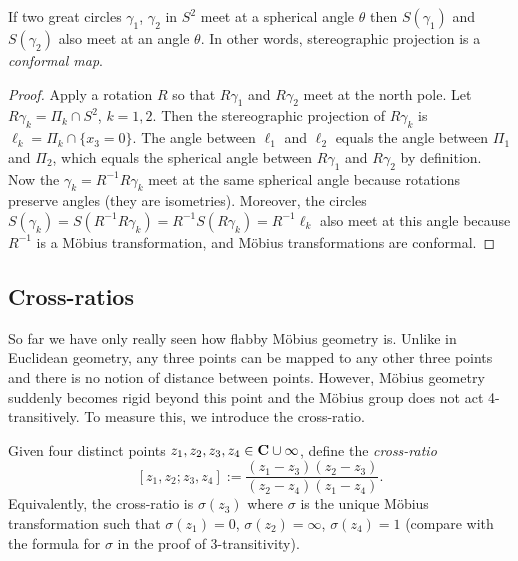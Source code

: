 \documentclass[12pt]{article}
\begin{document}
\begin{thm}
  If two great circles $\gamma_1$, $\gamma_2$ in $S^2$ meet at a spherical angle $\theta$ then $S(\gamma_1)$ and $S(\gamma_2)$ also meet at an angle $\theta$. In other words, stereographic projection is a {\em conformal map}.
\end{thm}
\begin{proof}
  Apply a rotation $R$ so that $R\gamma_1$ and $R\gamma_2$ meet at the north pole. Let $R\gamma_k=\Pi_k\cap S^2$, $k=1,2$. Then the stereographic projection of $R\gamma_k$ is $\ell_k=\Pi_k\cap\{x_3=0\}$. The angle between $\ell_1$ and $\ell_2$ equals the angle between $\Pi_1$ and $\Pi_2$, which equals the spherical angle between $R\gamma_1$ and $R\gamma_2$ by definition. Now the $\gamma_k=R^{-1}R\gamma_k$ meet at the same spherical angle because rotations preserve angles (they are isometries). Moreover, the circles $S(\gamma_k)=S(R^{-1}R\gamma_k)=R^{-1}S(R\gamma_k)=R^{-1}\ell_k$ also meet at this angle because $R^{-1}$ is a M\"obius transformation, and M\"obius transformations are conformal.
\end{proof}

\subsection{Cross-ratios}

So far we have only really seen how flabby M\"obius geometry is. Unlike in Euclidean geometry, any three points can be mapped to any other three points and there is no notion of distance between points. However, M\"obius geometry suddenly becomes rigid beyond this point and the M\"obius group does not act 4-transitively. To measure this, we introduce the cross-ratio.

\begin{dfn}
  Given four distinct points $z_1,z_2,z_3,z_4\in\mathbf{C}\cup\infty$, define the {\em cross-ratio}
  \[[z_1,z_2;z_3,z_4]:=\frac{(z_1-z_3)(z_2-z_3)}{(z_2-z_4)(z_1-z_4)}.\]
  Equivalently, the cross-ratio is $\sigma(z_3)$ where $\sigma$ is the unique M\"obius transformation such that $\sigma(z_1)=0$, $\sigma(z_2)=\infty$, $\sigma(z_4)=1$ (compare with the formula for $\sigma$ in the proof of 3-transitivity).
\end{dfn}
\end{document}
